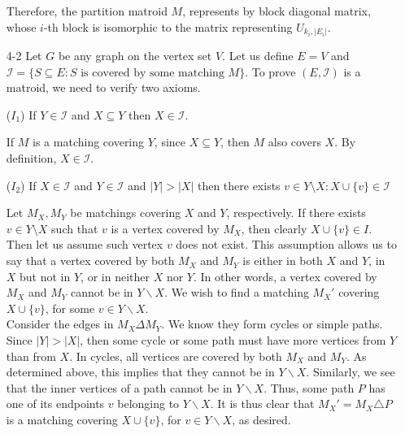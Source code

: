\documentclass[12pt]{article}
\newcommand{\I}{\mathcal I}
\begin{document}
\begin{enumerate}
Therefore, the partition matroid $M$, represents by block diagonal
matrix, whose $i$-th block is isomorphic to the matrix representing
$U_{k_i,|E_i|}.$
\fi
\item[4-2] %
Let $G$ be any graph on the vertex set $V$. Let us define $E = V$
and $\I  = \{ S \subseteq E: S \text{ is covered by some matching } M\}$.
To prove $(E, \I)$ is a matroid, we need to verify two axioms.

($I_1$) If $Y \in \I$ and $X \subseteq Y$ then $X \in \I$.

If $M$ is a matching covering $Y$, since $X\subseteq Y$, then $M$ also covers $X$. By definition, $X\in\I$.
	
($I_2$) If $X \in \I$ and $Y \in \I$ and $|Y| > |X|$ then there exists $v \in Y\setminus X : X \cup \{v\} \in\I$

Let $M_X, M_Y$ be matchings covering $X$ and $Y$, respectively.
If there exists $v\in Y\setminus X$ such that $v$ is a vertex covered by $M_X$,
then clearly $X \cup \{v\} \in I$. Then let us assume such vertex $v$ does not exist.
This assumption allows us to say that a vertex covered by both $M_X$ and $M_Y$
is either in both $X$ and $Y$, in $X$ but not in $Y$, or in neither $X$ nor $Y$.
In other words, a vertex covered by $M_X$ and $M_Y$ cannot be in $Y \backslash X$.
We wish to find a matching $M_X'$ covering $X \cup \{v\}$, for some $v \in Y \backslash X$.\\

Consider the edges in $M_X \Delta M_Y$. We know they form cycles or simple paths.
Since $|Y| > |X|$, then some cycle or some path must have more vertices from $Y$ than from $X$.
In cycles, all vertices are covered by both $M_X$ and $M_Y$.
As determined above, this implies that they cannot be in $Y \backslash X$.
Similarly, we see that the inner vertices of a path cannot be in $Y \backslash X$.
Thus, some path $P$ has one of its endpoints $v$ belonging to $Y \backslash X$.
It is thus clear that $M_X' = M_X \triangle P$ is a matching covering $X \cup \{v\}$,
for $v \in Y \backslash X$, as desired.


\end{enumerate}
\end{document}
